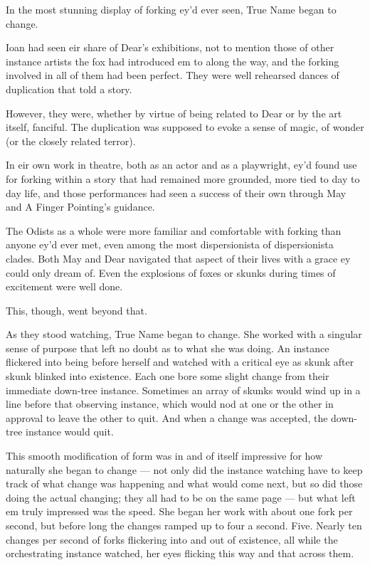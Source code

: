 In the most stunning display of forking ey'd ever seen, True Name began to change.

Ioan had seen eir share of Dear's exhibitions, not to mention those of other instance artists the fox had introduced em to along the way, and the forking involved in all of them had been perfect. They were well rehearsed dances of duplication that told a story.

However, they were, whether by virtue of being related to Dear or by the art itself, fanciful. The duplication was supposed to evoke a sense of magic, of wonder (or the closely related terror).

In eir own work in theatre, both as an actor and as a playwright, ey'd found use for forking within a story that had remained more grounded, more tied to day to day life, and those performances had seen a success of their own through May and A Finger Pointing's guidance.

The Odists as a whole were more familiar and comfortable with forking than anyone ey'd ever met, even among the most dispersionista of dispersionista clades. Both May and Dear navigated that aspect of their lives with a grace ey could only dream of. Even the explosions of foxes or skunks during times of excitement were well done.

This, though, went beyond that.

As they stood watching, True Name began to change. She worked with a singular sense of purpose that left no doubt as to what she was doing. An instance flickered into being before herself and watched with a critical eye as skunk after skunk blinked into existence. Each one bore some slight change from their immediate down-tree instance. Sometimes an array of skunks would wind up in a line before that observing instance, which would nod at one or the other in approval to leave the other to quit. And when a change was accepted, the down-tree instance would quit.

This smooth modification of form was in and of itself impressive for how naturally she began to change — not only did the instance watching have to keep track of what change was happening and what would come next, but so did those doing the actual changing; they all had to be on the same page — but what left em truly impressed was the speed. She began her work with about one fork per second, but before long the changes ramped up to four a second. Five. Nearly ten changes per second of forks flickering into and out of existence, all while the orchestrating instance watched, her eyes flicking this way and that across them.

